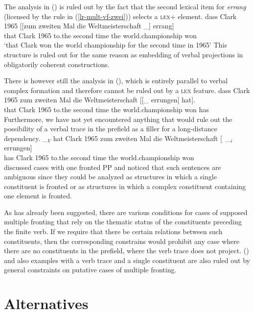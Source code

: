 The analysis in () is ruled out by the fact that the second lexical item for \emph{errang} (licensed
by the rule in (\ref{lr-mult-vf-zwei})) selects a \textsc{lex}+ element.
\ea
\label{bsp-trace-mit-argumenten-im-mf}
\gll dass Clark 1965 [[zum zweiten Mal die Weltmeisterschaft \_] errang]\\
     that Clark 1965 \hspaceThis{[[}to.the second time the world.championship {} won\\
\glt `that Clark won the world championship for the second time in 1965'
\z
This structure is ruled out for the same reason as embedding of verbal projections in obligatorily coherent 
constructions.

There is however still the analysis in (), which is entirely parallel to verbal complex formation and therefore
cannot be ruled out by a \textsc{lex} feature.
\ea
\gll dass Clark 1965 zum zweiten Mal die Weltmeisterschaft     [[\_ errungen] hat].\\
     that Clark 1965 to.the second time the world.championship {} won has\\
\z
Furthermore, we have not yet encountered anything that would rule out the possibility of a verbal trace in the prefield as a filler
for a long-distance dependency.
\ea
\gll \_$_V$ hat Clark 1965 zum zweiten Mal die Weltmeisterschaft [~\_$_i$ errungen]\\
     {}     has Clark 1965 to.the second time the world.championship {} won\\
\z
\citet[]{Fanselow87a} discussed cases with one fronted PP and noticed that such sentences
are ambiguous since they could be analyzed as structures in which a single constituent is fronted or
as structures in which a complex constituent containing one element is fronted.

As has already been suggested, there are various conditions for cases of supposed multiple fronting that rely on the thematic status
of the constituents preceding the finite verb. If we require that there be certain relations between such constituents, then the corresponding
constrains would prohibit any case where there are no constituents in the prefield, \ie where the verb trace does not project. () and
also examples with a verb trace and a single constituent are also ruled out by general constraints
on putative cases of multiple fronting.


\section{Alternatives}
\label{sec-analyse-mfvorschlaege}

